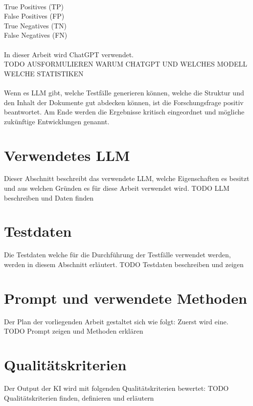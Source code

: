 \documentclass[12pt,toc=bib,toc=listof]{scrreprt}
\begin{document}
\\
True Positives (TP)\\
False Positives (FP)\\
True Negatives (TN)\\ 
False Negatives (FN)\\
\\
In dieser Arbeit wird ChatGPT verwendet.\\
TODO AUSFORMULIEREN WARUM CHATGPT UND WELCHES MODELL WELCHE STATISTIKEN\\
\\
Wenn es LLM gibt, welche Testfälle generieren können, welche die Struktur und den Inhalt der Dokumente gut abdecken können, ist die Forschungsfrage positiv beantwortet. Am Ende werden die Ergebnisse kritisch eingeordnet und mögliche zukünftige Entwicklungen genannt.

\section{Verwendetes LLM} %
\label{sec:verwendetesLLM}
Dieser Abschnitt beschreibt das verwendete LLM, welche Eigenschaften es besitzt und aus welchen Gründen es für diese Arbeit verwendet wird.
TODO LLM beschreiben und Daten finden

\section{Testdaten} %
\label{sec:testdaten}
Die Testdaten welche für die Durchführung der Testfälle verwendet werden, werden in diesem Abschnitt erläutert.
TODO Testdaten beschreiben und zeigen

\section{Prompt und verwendete Methoden} %
\label{sec:promptUndVerwendeteMethoden}
Der Plan der vorliegenden Arbeit gestaltet sich wie folgt: Zuerst wird eine.
TODO Prompt zeigen und Methoden erklären

\section{Qualitätskriterien} %
\label{sec:qualitätskriterien}
Der Output der KI wird mit folgenden Qualitätskriterien bewertet:
TODO Qualitätskriterien finden, definieren und erläutern
\end{document}

